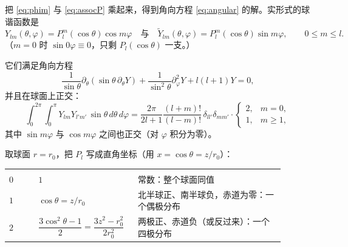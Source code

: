 把 \eqref{eq:phim} 与 \eqref{eq:assocP} 乘起来，得到角向方程 \eqref{eq:angular} 的解。实形式的球谐函数是
\begin{equation}
Y_{lm}(\theta,\varphi)=P_l^m(\cos\theta)\cos m\varphi
\quad\text{与}\quad
\tilde Y_{lm}(\theta,\varphi)=P_l^m(\cos\theta)\sin m\varphi ,
\qquad 0\le m\le l .
\label{eq:spherical}
\end{equation}
（$m=0$ 时 $\sin0\varphi\equiv0$，只剩 $P_l(\cos\theta)$ 一支。）

它们满足角向方程
\[
\frac{1}{\sin\theta}\partial_\theta(\sin\theta\,\partial_\theta Y)+\frac{1}{\sin^2\theta}\partial_\varphi^2Y+l(l+1)Y=0 ,
\]
并且在球面上正交：
\begin{equation}
\int_0^{2\pi}\!\!\int_0^{\pi}Y_{lm}Y_{l'm'}\,\sin\theta\,d\theta\,d\varphi
=\frac{2\pi}{2l+1}\frac{(l+m)!}{(l-m)!}\,\delta_{ll'}\delta_{mm'}\cdot
\begin{cases}
2,& m=0,\\
1,& m\ge1,
\end{cases}
\label{eq:orthY}
\end{equation}
其中 $\sin m\varphi$ 与 $\cos m\varphi$ 之间也正交（对 $\varphi$ 积分为零）。



取球面 $r=r_0$，把 $P_l$ 写成直角坐标（用 $x=\cos\theta=z/r_0$）：

\begin{center}
\tabtop
\begin{tabular}{@{}L{0.10\linewidth}L{0.30\linewidth}L{0.50\linewidth}@{}}
 &  &  \\
\tabmidrule
$0$ & $1$ & 常数：整个球面同值 \\
$1$ & $\cos\theta=z/r_0$ & 北半球正、南半球负，赤道为零：一个偶极分布 \\
$2$ & $\dfrac{3\cos^2\theta-1}{2}=\dfrac{3z^2-r_0^2}{2r_0^2}$ & 两极正、赤道负（或反过来）：一个四极分布 \\
\end{tabular}
\tabbot
\end{center}


\clearpage
